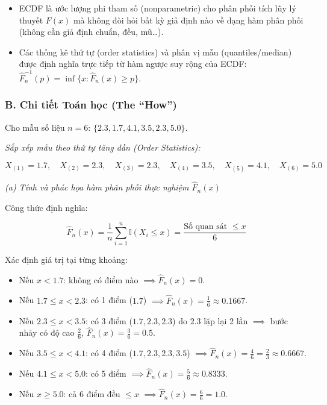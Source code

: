 \documentclass[12pt,a4paper]{article}
\begin{document}
\begin{itemize}

\item
  ECDF là ước lượng phi tham số (nonparametric) cho phân phối tích lũy lý thuyết \(F(x)\) mà không đòi hỏi bất kỳ giả định nào về dạng hàm phân phối (không cần giả định chuẩn, đều, mũ\ldots).
\item
  Các thống kê thứ tự (order statistics) và phân vị mẫu (quantiles/median) được định nghĩa trực tiếp từ hàm ngược suy rộng của ECDF: \(\widehat{F}_n^{-1}(p) = \inf \{x : \widehat{F}_n(x) \ge p\}\).
\end{itemize}

\subsubsection{B. Chi tiết Toán học (The ``How'')}\label{b.-chi-tiux1ebft-touxe1n-hux1ecdc-the-how-5}

Cho mẫu số liệu \(n = 6\): \(\{2.3, 1.7, 4.1, 3.5, 2.3, 5.0\}\).

\emph{Sắp xếp mẫu theo thứ tự tăng dần (Order Statistics):}

\[X_{(1)} = 1.7, \quad X_{(2)} = 2.3, \quad X_{(3)} = 2.3, \quad X_{(4)} = 3.5, \quad X_{(5)} = 4.1, \quad X_{(6)} = 5.0\]

\emph{(a) Tính và phác họa hàm phân phối thực nghiệm \(\widehat{F}_n(x)\)}

Công thức định nghĩa:

\[\widehat{F}_n(x) = \frac{1}{n} \sum_{i=1}^n \mathbb{I}(X_i \le x) = \frac{\text{Số quan sát } \le x}{6}\]

Xác định giá trị tại từng khoảng:

\begin{itemize}

\item
  Nếu \(x < 1.7\): không có điểm nào \(\implies \widehat{F}_n(x) = 0\).
\item
  Nếu \(1.7 \le x < 2.3\): có 1 điểm (\(1.7\)) \(\implies \widehat{F}_n(x) = \frac{1}{6} \approx 0.1667\).
\item
  Nếu \(2.3 \le x < 3.5\): có 3 điểm (\(1.7, 2.3, 2.3\)) do \(2.3\) lặp lại 2 lần \(\implies\) bước nhảy có độ cao \(\frac{2}{6}\), \(\widehat{F}_n(x) = \frac{3}{6} = 0.5\).
\item
  Nếu \(3.5 \le x < 4.1\): có 4 điểm (\(1.7, 2.3, 2.3, 3.5\)) \(\implies \widehat{F}_n(x) = \frac{4}{6} = \frac{2}{3} \approx 0.6667\).
\item
  Nếu \(4.1 \le x < 5.0\): có 5 điểm \(\implies \widehat{F}_n(x) = \frac{5}{6} \approx 0.8333\).
\item
  Nếu \(x \ge 5.0\): cả 6 điểm đều \(\le x\) \(\implies \widehat{F}_n(x) = \frac{6}{6} = 1.0\).
\end{itemize}
\end{document}
